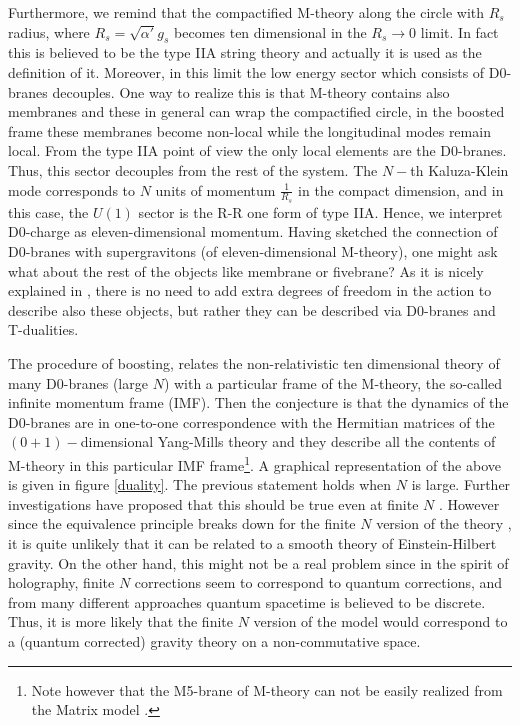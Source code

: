 \documentclass[11pt,english]{article}
\numberwithin{equation}{section}
\begin{document}
Furthermore, we remind  that the compactified M-theory along the circle with $R_s$ radius, where $R_s=\sqrt{\alpha'}g_s$ becomes ten dimensional in the $R_s\to 0$ limit. In fact this is believed to be the type IIA string theory and actually it is used as the definition of it. Moreover, in this limit the low energy sector which consists of D0-branes decouples. One way to realize this is that M-theory contains also membranes and these in general can wrap the compactified circle, in the boosted frame these membranes  become non-local while the longitudinal modes remain local. From the type IIA point of view the only local elements are the D0-branes. Thus, this sector decouples from the rest of the system. The $N-$th Kaluza-Klein mode corresponds to $N$ units of momentum $\frac{1}{R_s}$ in the compact dimension, and in this case, the $U(1)$ sector is the R-R one form of type IIA. Hence, we interpret D0-charge as eleven-dimensional momentum. Having sketched the connection of D0-branes with supergravitons (of eleven-dimensional M-theory), one might ask what about the rest of the objects like  membrane or fivebrane? As it is nicely explained in \cite{Sen1998}, there is no need to add extra degrees of freedom in the action to describe also these objects, but rather they can be described via D0-branes and T-dualities. 

The procedure of boosting, relates the non-relativistic ten dimensional theory of many D0-branes (large $N$) with a particular frame of the M-theory, the so-called infinite momentum frame (IMF). Then the conjecture is that the dynamics of the D0-branes are in one-to-one correspondence with the Hermitian matrices of the $(0+1)-$dimensional Yang-Mills theory  and they describe all the contents of M-theory in this particular IMF frame\footnote{Note however that the M5-brane of M-theory can not be easily realized from the Matrix model \cite{Berenstein2002}.}. A graphical representation of the above is given in figure \ref{duality}. The previous statement holds when $N$ is large. Further investigations have proposed that this should be true even at finite $N$ \cite{Susskind1997}. However since the equivalence principle breaks down for the finite $N$ version of the theory \cite{Taylor2000a}, \cite{Kabat1998} it is quite unlikely that it can be related to a smooth theory of Einstein-Hilbert gravity. On the other hand, this might not be a real problem since in the spirit of holography, finite $N$ corrections seem to correspond to quantum corrections, and from many different approaches quantum spacetime is believed to be discrete. Thus, it is more likely that the finite $N$ version of the model would correspond to a (quantum corrected) gravity theory on a non-commutative space. 
\end{document}
